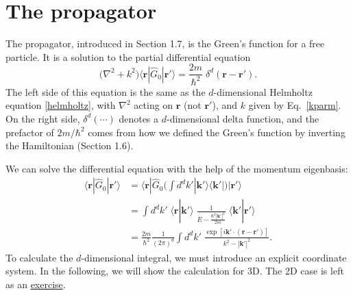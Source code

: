 \documentclass[pra,12pt]{revtex4}
\begin{document}
\section{The propagator}
\label{sec:propagator}

The propagator, introduced in Section 1.7, is the Green's function for
a free particle.  It is a solution to the partial differential
equation
\begin{equation}
  \Big(\nabla^2 + k^2\Big) \langle\mathbf{r} |\hat{G}_0 |\mathbf{r}'\rangle
  = \frac{2m}{\hbar^2} \; \delta^d(\mathbf{r}-\mathbf{r}').
\end{equation}
The left side of this equation is the same as the $d$-dimensional
Helmholtz equation \eqref{helmholtz}, with $\nabla^2$ acting on
$\mathbf{r}$ (not $\mathbf{r}'$), and $k$ given by Eq.~\eqref{kparm}.
On the right side, $\delta^d(\cdots)$ denotes a $d$-dimensional delta
function, and the prefactor of $2m/\hbar^2$ comes from how we defined
the Green's function by inverting the Hamiltonian (Section 1.6).

We can solve the differential equation with the help of the momentum
eigenbasis:
\begin{align}
  \langle\mathbf{r}|\hat{G}_0|\mathbf{r}'\rangle
  &= \langle\mathbf{r}|\hat{G}_0 \Big(\int d^dk' |\mathbf{k}'\rangle\langle\mathbf{k}'| \Big) |\mathbf{r}'\rangle \nonumber \\
  &= \int d^dk' \; \langle\mathbf{r}|\mathbf{k}'\rangle \;
  \frac{1}{E-\frac{\hbar^2|\mathbf{k}'|^2}{2m}} \;
  \langle\mathbf{k}'|\mathbf{r}'\rangle \nonumber \\
  &= \frac{2m}{\hbar^2} \frac{1}{(2\pi)^d} \int d^dk' \;
  \frac{\exp\left[i\mathbf{k}' \cdot
      (\mathbf{r}-\mathbf{r}')\right]}{k^2-|\mathbf{k}'|^2}.
  \label{rGr}
\end{align}
To calculate the $d$-dimensional integral, we must introduce an
explicit coordinate system.  In the following, we will show the
calculation for 3D.  The 2D case is left as an
\hyperref[ex:2dpropagator]{exercise}.
\end{document}
